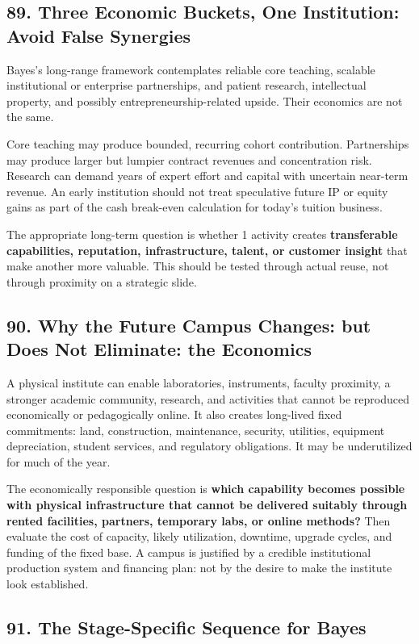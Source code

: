 \subsection*{89. Three Economic Buckets, One Institution: Avoid False Synergies}

Bayes's long-range framework contemplates reliable core teaching, scalable institutional or enterprise partnerships, and patient research, intellectual property, and possibly entrepreneurship-related upside. Their economics are not the same.

Core teaching may produce bounded, recurring cohort contribution. Partnerships may produce larger but lumpier contract revenues and concentration risk. Research can demand years of expert effort and capital with uncertain near-term revenue. An early institution should not treat speculative future IP or equity gains as part of the cash break-even calculation for today's tuition business.

The appropriate long-term question is whether 1 activity creates \textbf{transferable capabilities, reputation, infrastructure, talent, or customer insight} that make another more valuable. This should be tested through actual reuse, not through proximity on a strategic slide.

\subsection*{90. Why the Future Campus Changes: but Does Not Eliminate: the Economics}

A physical institute can enable laboratories, instruments, faculty proximity, a stronger academic community, research, and activities that cannot be reproduced economically or pedagogically online. It also creates long-lived fixed commitments: land, construction, maintenance, security, utilities, equipment depreciation, student services, and regulatory obligations. It may be underutilized for much of the year.

The economically responsible question is \textbf{which capability becomes possible with physical infrastructure that cannot be delivered suitably through rented facilities, partners, temporary labs, or online methods?} Then evaluate the cost of capacity, likely utilization, downtime, upgrade cycles, and funding of the fixed base. A campus is justified by a credible institutional production system and financing plan: not by the desire to make the institute look established.

\subsection*{91. The Stage-Specific Sequence for Bayes}

